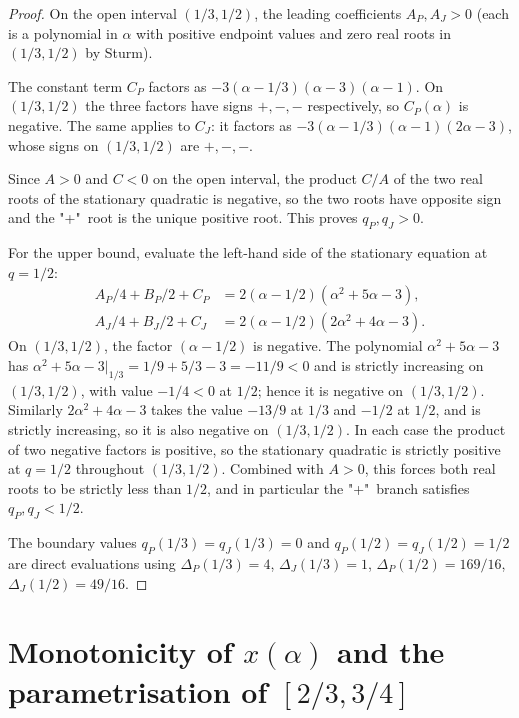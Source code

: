 \documentclass[11pt]{amsart}
\theoremstyle{definition}
\begin{document}
\begin{proof}
On the open interval $(1/3,1/2)$, the leading coefficients
$A_P, A_J > 0$ (each is a polynomial in $\alpha$ with positive endpoint values
and zero real roots in $(1/3,1/2)$ by Sturm).

The constant term $C_P$ factors as $-3(\alpha-1/3)(\alpha-3)(\alpha-1)$.
On $(1/3,1/2)$ the three factors have signs $+,-,-$ respectively, so
$C_P(\alpha)$ is negative.  The same applies to $C_J$: it factors as
$-3(\alpha-1/3)(\alpha-1)(2\alpha-3)$, whose signs on $(1/3,1/2)$ are $+,-,-$.

Since $A>0$ and $C<0$ on the open interval, the product $C/A$ of the two
real roots of the stationary quadratic is negative, so the two roots have
opposite sign and the "+"~root is the unique positive root.  This proves
$q_P,q_J > 0$.

For the upper bound, evaluate the left-hand side of the stationary equation
at $q=1/2$:
\begin{align*}
A_P/4 + B_P/2 + C_P
   &= 2(\alpha-1/2)(\alpha^2+5\alpha-3), \\
A_J/4 + B_J/2 + C_J
   &= 2(\alpha-1/2)(2\alpha^2+4\alpha-3).
\end{align*}
On $(1/3,1/2)$, the factor $(\alpha-1/2)$ is negative.  The polynomial
$\alpha^2+5\alpha-3$ has $\alpha^2+5\alpha-3\big|_{1/3} = 1/9+5/3-3=-11/9 < 0$
and is strictly increasing on $(1/3,1/2)$, with value $-1/4 < 0$ at $1/2$;
hence it is negative on $(1/3,1/2)$.  Similarly $2\alpha^2+4\alpha-3$ takes
the value $-13/9$ at $1/3$ and $-1/2$ at $1/2$, and is strictly increasing,
so it is also negative on $(1/3,1/2)$.  In each case the product of two
negative factors is positive, so the stationary quadratic is strictly
positive at $q=1/2$ throughout $(1/3,1/2)$.  Combined with $A>0$, this
forces both real roots to be strictly less than $1/2$, and in particular
the "+"~branch satisfies $q_P,q_J < 1/2$.

The boundary values $q_P(1/3)=q_J(1/3)=0$ and $q_P(1/2)=q_J(1/2)=1/2$ are
direct evaluations using $\Delta_P(1/3)=4$, $\Delta_J(1/3)=1$,
$\Delta_P(1/2)=169/16$, $\Delta_J(1/2)=49/16$.
\end{proof}

\section{Monotonicity of \texorpdfstring{$x(\alpha)$}{x(alpha)} and the parametrisation of $[2/3,3/4]$}
\label{sec:monotonicity}
\end{document}
